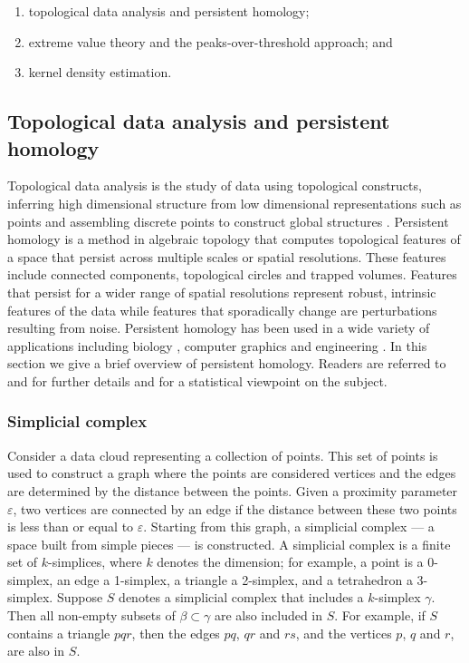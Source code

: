 \documentclass[12pt]{article}
\providecommand{\tightlist}{%
  \setlength{\itemsep}{0pt}\setlength{\parskip}{0pt}}
\theoremstyle{definition}
\theoremstyle{definition}
\theoremstyle{definition}
\theoremstyle{definition}
\theoremstyle{remark}
\begin{document}
\begin{enumerate}
\def\labelenumi{\arabic{enumi}.}
\tightlist
\item
  topological data analysis and persistent homology;
\item
  extreme value theory and the peaks-over-threshold approach; and
\item
  kernel density estimation.
\end{enumerate}

\hypertarget{subsec:tda}{%
\subsection{Topological data analysis and persistent homology}\label{subsec:tda}}

Topological data analysis is the study of data using topological constructs, inferring high dimensional structure from low dimensional representations such as points and assembling discrete points to construct global structures \citep{ghrist2008barcodes}. Persistent homology is a method in algebraic topology that computes topological features of a space that persist across multiple scales or spatial resolutions. These features include connected components, topological circles and trapped volumes. Features that persist for a wider range of spatial resolutions represent robust, intrinsic features of the data while features that sporadically change are perturbations resulting from noise. Persistent homology has been used in a wide variety of applications including biology \citep{topaz2015topological}, computer graphics \citep{carlsson2008local} and engineering \citep{perea2015sliding}. In this section we give a brief overview of persistent homology. Readers are referred to \citet{ghrist2008barcodes} and \citet{Carlsson2009} for further details and \citet{wasserman2018topological} for a statistical viewpoint on the subject.

\hypertarget{simplicial-complex}{%
\subsubsection*{Simplicial complex}\label{simplicial-complex}}

Consider a data cloud representing a collection of points. This set of points is used to construct a graph where the points are considered vertices and the edges are determined by the distance between the points. Given a proximity parameter \(\varepsilon\), two vertices are connected by an edge if the distance between these two points is less than or equal to \(\varepsilon\). Starting from this graph, a simplicial complex --- a space built from simple pieces --- is constructed. A simplicial complex is a finite set of \(k\)-simplices, where \(k\) denotes the dimension; for example, a point is a 0-simplex, an edge a 1-simplex, a triangle a 2-simplex, and a tetrahedron a 3-simplex. Suppose \(S\) denotes a simplicial complex that includes a \(k\)-simplex \(\gamma\). Then all non-empty subsets of \(\beta \subset \gamma\) are also included in \(S\). For example, if \(S\) contains a triangle \(pqr\), then the edges \(pq\), \(qr\) and \(rs\), and the vertices \(p\), \(q\) and \(r\), are also in \(S\).
\end{document}
